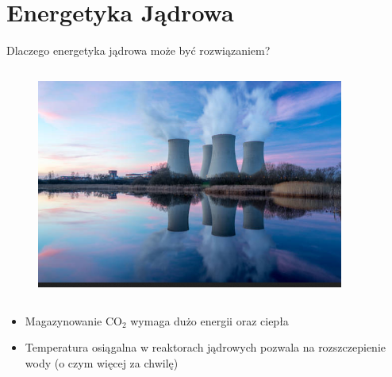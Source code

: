 \section{Energetyka Jądrowa}

\begin{columnframe}{Dlaczego energetyka jądrowa może być rozwiązaniem?}
    \begin{column}{0.5\textwidth}
        \begin{figure}
            \centering
            \includegraphics[width=0.9\textwidth, frame]{images/nuclear_powerplant_shutterstock.png}
        \end{figure}
    \end{column}
    \begin{column}{0.5\textwidth}
        \begin{itemize}
            \item Magazynowanie CO$_2$ wymaga dużo energii oraz ciepła
            \item Temperatura osiągalna w reaktorach jądrowych pozwala na rozszczepienie wody (o czym więcej za chwilę)
        \end{itemize}
    \end{column}
\end{columnframe}


